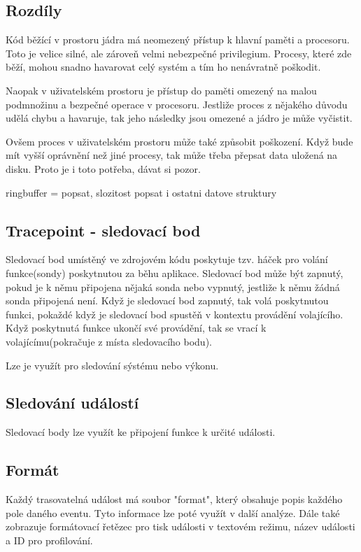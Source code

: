 \subsection*{Rozdíly}
Kód běžící v prostoru jádra má neomezený přístup k hlavní paměti a procesoru. Toto je velice silné, ale zároveň velmi nebezpečné privilegium.
Procesy, které zde běží, mohou snadno havarovat celý systém a tím ho nenávratně poškodit.

Naopak v uživatelském prostoru je přístup do paměti omezený na malou podmnožinu a bezpečné operace v procesoru. Jestliže proces z nějakého
důvodu udělá chybu a havaruje, tak jeho následky jsou omezené a jádro je může vyčistit.

Ovšem proces v uživatelském prostoru může také způsobit poškození. Když bude mít vyšší oprávnění než jiné procesy, tak může třeba přepsat
data uložená na disku. Proto je i toto potřeba, dávat si pozor.

ringbuffer = popsat, slozitost
popsat i ostatni datove struktury

\subsection{Tracepoint - sledovací bod}
Sledovací bod umístěný ve zdrojovém kódu poskytuje tzv. háček pro volání funkce(sondy) poskytnutou za běhu aplikace. Sledovací bod může
být zapnutý, pokud je k němu připojena nějaká sonda nebo vypnutý, jestliže k němu žádná sonda připojená není. Když je sledovací bod
zapnutý, tak volá poskytnutou funkci, pokaždé když je sledovací bod spustěň v kontextu provádění volajícího. Když poskytnutá funkce
ukončí své provádění, tak se vrací k volajícímu(pokračuje z místa sledovacího bodu).

Lze je využít pro sledování sýstému nebo výkonu.

\subsection {Sledování událostí}
Sledovací body lze využít ke připojení funkce k určité události.

\subsection*{Formát}
Každý trasovatelná událost má soubor "format", který obsahuje popis každého pole daného eventu. Tyto informace lze poté využít v další
analýze. Dále také zobrazuje formátovací řetězec pro tisk události v textovém režimu, název události a ID pro profilování.

